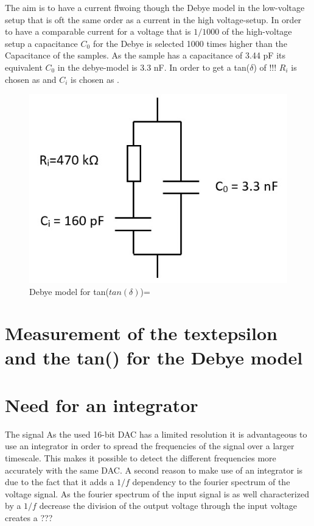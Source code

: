 The aim is to have a current flwoing though the Debye model in the low-voltage setup that is oft the same order as a current in the high voltage-setup. In order to have a comparable current for a voltage that is $1/1000$ of the high-voltage setup a capacitance $C_0$ for the Debye is selected 1000 times higher than the Capacitance of the samples. As the sample has a capacitance of 3.44 pF its equivalent $C_0$ in the debye-model is 3.3 nF. In order to get a tan($\delta$) of !!! $R_i$ is chosen as and $C_i$ is chosen as .
\begin{figure}
	\includegraphics{figures/Methods/debye-modell.jpg}	
	\caption{Debye model for tan($tan(\delta)$)= }	
\end{figure}


\section{Measurement of the textepsilon and the tan(\textdelta) for the Debye model}




\section{Need for an integrator}
The signal 
As the used 16-bit DAC has a limited resolution it is advantageous to use an integrator in order to spread the frequencies of the signal over a larger timescale. This makes it possible to detect the different frequencies more accurately with the same DAC. 
A second reason to make use of an integrator is due to the fact that it adds a $1/f$ dependency to the fourier spectrum of the voltage signal. As the fourier spectrum of the input signal is as well characterized by a $1/f$ decrease the division of the output voltage through the input voltage creates a ???
\newpage

